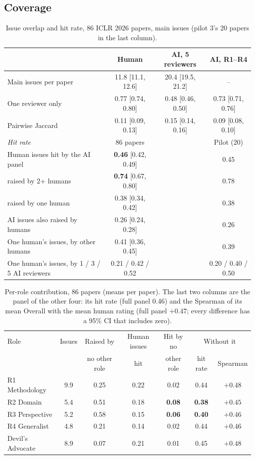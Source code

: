\documentclass[11pt,a4paper]{article}
\begin{document}
\subsection{Coverage}
\begin{table}[h]
\centering
\small
\caption{Issue overlap and hit rate, 86 ICLR 2026 papers, main issues (pilot 3's 20 papers in the last column).}\label{tab:overlap}
\setlength{\tabcolsep}{3pt}
\begin{tabular}{lccc}
\toprule
 & Human & AI, 5 reviewers & AI, R1--R4\\
\midrule
Main issues per paper & 11.8 [11.1, 12.6] & 20.4 [19.5, 21.2] & --\\
One reviewer only & 0.77 [0.74, 0.80] & 0.48 [0.46, 0.50] & 0.73 [0.71, 0.76]\\
Pairwise Jaccard & 0.11 [0.09, 0.13] & 0.15 [0.14, 0.16] & 0.09 [0.08, 0.10]\\
\midrule
\emph{Hit rate} & 86 papers & & Pilot (20)\\
Human issues hit by the AI panel & \textbf{0.46} [0.42, 0.49] & & 0.45\\
\quad raised by 2+ humans & \textbf{0.74} [0.67, 0.80] & & 0.78\\
\quad raised by one human & 0.38 [0.34, 0.42] & & 0.38\\
AI issues also raised by humans & 0.26 [0.24, 0.28] & & 0.26\\
One human's issues, by other humans & 0.41 [0.36, 0.45] & & 0.39\\
One human's issues, by 1 / 3 / 5 AI reviewers & 0.21 / 0.42 / 0.52 & & 0.20 / 0.40 / 0.50\\
\bottomrule
\end{tabular}
\end{table}

\begin{table}[h]
\centering
\small
\caption{Per-role contribution, 86 papers (means per paper). The last two columns are the
panel of the other four: its hit rate (full panel 0.46) and the Spearman of its mean Overall with
the mean human rating (full panel $+0.47$; every difference has a 95\% CI that includes zero).}\label{tab:roles}
\setlength{\tabcolsep}{3pt}
\begin{tabular}{lcccccc}
\toprule
Role & Issues & Raised by & Human issues & Hit by no & \multicolumn{2}{c}{Without it}\\
 & & no other role & hit & other role & hit rate & Spearman\\
\midrule
R1 Methodology & 9.9 & 0.25 & 0.22 & 0.02 & 0.44 & $+0.48$\\
R2 Domain & 5.4 & 0.51 & 0.18 & \textbf{0.08} & \textbf{0.38} & $+0.45$\\
R3 Perspective & 5.2 & 0.58 & 0.15 & \textbf{0.06} & \textbf{0.40} & $+0.46$\\
R4 Generalist & 4.8 & 0.21 & 0.14 & 0.02 & 0.44 & $+0.46$\\
Devil's Advocate & 8.9 & 0.07 & 0.21 & 0.01 & 0.45 & $+0.48$\\
\bottomrule
\end{tabular}
\end{table}
\end{document}
